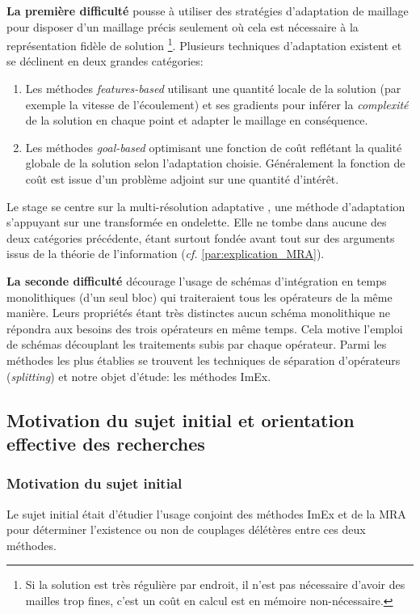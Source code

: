     \textbf{La première difficulté} pousse à utiliser des stratégies d'adaptation de maillage pour disposer d'un maillage précis seulement où cela est nécessaire à la représentation fidèle de solution
    \footnote{Si la solution est très régulière par endroit, il n'est pas nécessaire d'avoir des mailles trop fines, c'est un coût en calcul est en mémoire non-nécessaire.}.
    Plusieurs techniques d'adaptation existent et se déclinent en deux grandes catégories\cite{Vivarelli2025Fluids}:
    \begin{enumerate}
        \item Les méthodes \textit{features-based} utilisant une quantité locale de la solution (par exemple la vitesse de l'écoulement) 
        et ses gradients pour inférer la \textit{complexité} de la solution en chaque point et adapter le maillage en conséquence.
        \item Les méthodes \textit{goal-based} optimisant une fonction de coût reflétant la qualité globale de la solution selon l'adaptation choisie.
        Généralement la fonction de coût est issue d'un problème adjoint sur une quantité d'intérêt.
    \end{enumerate}
    Le stage se centre sur la multi-résolution adaptative \cite{harten1994}, une méthode d'adaptation s'appuyant sur une transformée en ondelette.
    Elle ne tombe dans aucune des deux catégories précédente, étant surtout fondée avant tout sur des arguments issus de la théorie de l'information 
    (\textit{cf.} \ref{par:explication_MRA}).\par

    \textbf{La seconde difficulté} décourage l'usage de schémas d'intégration en temps monolithiques (d'un seul bloc) qui traiteraient tous les opérateurs de la même manière.
    Leurs propriétés étant très distinctes aucun schéma monolithique ne répondra aux besoins des trois opérateurs en même temps.
    Cela motive l'emploi de schémas découplant les traitements subis par chaque opérateur. Parmi les méthodes les plus établies se trouvent 
    les techniques de séparation d'opérateurs (\textit{splitting}) et notre objet d'étude: les méthodes ImEx.

\subsection{Motivation du sujet initial et orientation effective des recherches}
    \subsubsection{Motivation du sujet initial}
    Le sujet initial était d'étudier l'usage conjoint des méthodes ImEx et de la MRA pour déterminer l'existence ou non de couplages délétères entre ces deux méthodes.\par 

